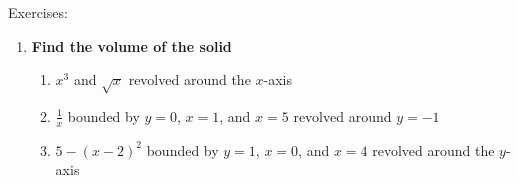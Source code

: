 \documentclass[../revisedmain.tex]{subfiles}
\begin{document}
\begin{center}
	\LARGE Exercises:
\end{center}
\begin{enumerate}
	\item \textbf{Find the volume of the solid}
	\begin{enumerate}
		\item $x^3$ and $\sqrt{x}$ revolved around the $x$-axis
		\item $\frac{1}{x}$ bounded by $y=0$, $x=1$, and $x=5$ revolved around $y=-1$
		\item $5-(x-2)^2$ bounded by $y=1$, $x=0$, and $x=4$ revolved around the $y$-axis
	\end{enumerate}
\end{enumerate}
\end{document}
